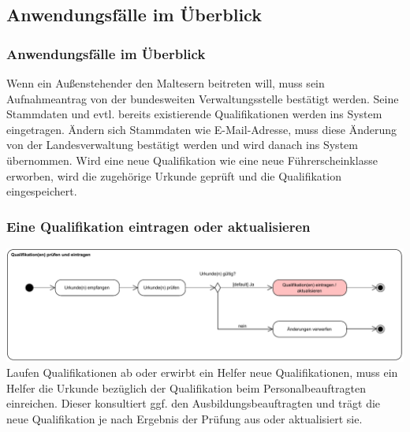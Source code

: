 \documentclass{beamer}
\begin{document}
\subsection{Anwendungsfälle im Überblick}		
\begin{frame}
\frametitle{Anwendungsfälle im Überblick}
\begin{acronym}
	 {Wenn ein Außenstehender den Maltesern beitreten will, muss sein Aufnahmeantrag von der bundesweiten Verwaltungsstelle bestätigt werden. Seine Stammdaten und evtl. bereits existierende Qualifikationen werden ins System eingetragen.}
	\pause
	 {Ändern sich Stammdaten wie E-Mail-Adresse, muss diese Änderung von der Landesverwaltung bestätigt werden und wird danach ins System übernommen.}
	\pause
	 {Wird eine neue Qualifikation wie eine neue Führerscheinklasse erworben, wird die zugehörige Urkunde geprüft und die Qualifikation eingespeichert.}
\end{acronym}
\end{frame}
\begin{frame}
\frametitle{Eine Qualifikation eintragen oder aktualisieren}
\includegraphics[width=\textwidth]{PDF/BusinessP/Qualifikation_eintragen.pdf}
\pause
Laufen Qualifikationen ab oder erwirbt ein Helfer neue Qualifikationen, muss ein Helfer die Urkunde bezüglich der Qualifikation beim Personalbeauftragten einreichen. Dieser konsultiert ggf. den Ausbildungsbeauftragten und trägt die neue Qualifikation je nach Ergebnis der Prüfung aus oder aktualisiert sie.
\end{frame}
\end{document}
